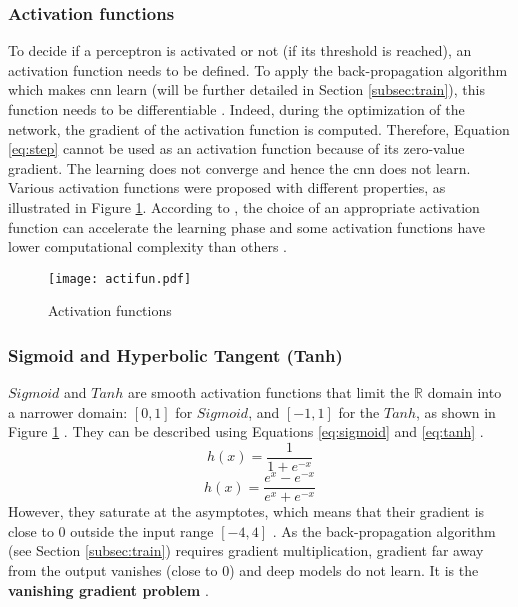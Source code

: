 \subsubsection{Activation functions} \label{subs:acti}
To decide if a perceptron is activated or not (if its threshold is reached), an activation function needs to be defined. To apply the back-propagation algorithm which makes \acrshort{cnn} learn (will be further detailed in Section \ref{subsec:train}), this function needs to be differentiable \cite{lecun_backpropagation_1989}. Indeed, during the optimization of the network, the gradient of the activation function is computed. Therefore, Equation \ref{eq:step} cannot be used as an activation function because of its zero-value gradient. The learning does not converge and hence the \acrshort{cnn} does not learn. Various activation functions were proposed with different properties, as illustrated in Figure \ref{fig:acti}. According to \textcite{khan_survey_2020}, the choice of an appropriate activation function can accelerate the learning phase and some activation functions have lower computational complexity than others \cite{krizhevsky_imagenet_2012}.
%
\begin{figure}[H]
    \centering
    \texttt{[image: actifun.pdf]}
    \caption{Activation functions}
    \label{fig:acti}
\end{figure}
%
\subsubsection{Sigmoid and Hyperbolic Tangent (Tanh)}
$Sigmoid$ and $Tanh$ are smooth activation functions that limit the $\mathbb{R}$ domain into a narrower domain: $[0, 1]$ for $Sigmoid$, and $[-1, 1]$ for the $Tanh$, as shown in Figure \ref{fig:acti} \cite{matteucci_artificial_2019}. They can be described using Equations \eqref{eq:sigmoid} and \eqref{eq:tanh} \cite{krizhevsky_imagenet_2012}.
%
\begin{equation}
    h(x) = \frac{1}{1 + e^{-x}}
    \label{eq:sigmoid}
\end{equation}
%
\begin{equation}
    h(x) = \frac{e^{x} - e^{-x}}{e^{x} + e^{-x}}
    \label{eq:tanh}
\end{equation}
%
However, they saturate at the asymptotes, which means that their gradient is close to 0 outside the input range $[-4, 4]$ \cite{glorot_understanding_2010}. As the back-propagation algorithm (see Section \ref{subsec:train}) requires gradient multiplication, gradient far away from the output vanishes (close to 0) and deep models do not learn. It is the \textbf{vanishing gradient problem} \cite{khan_survey_2020, matteucci_artificial_2019, goodfellow_deep_2016, maas_rectier_2013}.
%
